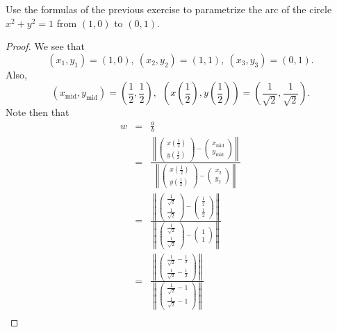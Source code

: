 \begin{exercise}{17}
    Use the formulas of the previous exercise to parametrize the arc of the circle $x^2 + y^2 = 1$ from $(1,0)$ to $(0,1)$.
\end{exercise}
\begin{proof}
We see that
$$(x_1,y_1) = (1,0),~(x_2,y_2) = (1,1),~(x_3,y_3) = (0,1).$$
Also,
$$(x_{\text{mid}}, y_{\text{mid}}) = \left(\frac{1}{2}, \frac{1}{2}\right),~~\left(x\left(\frac{1}{2}\right), y\left(\frac{1}{2}\right)\right) = \left(\frac{1}{\sqrt{2}},\frac{1}{\sqrt{2}}\right).$$
Note then that
\begin{eqnarray*}
    w
    & = & \frac{a}{b}\\
    & = & \frac{\left\|\left(\begin{array}{c} x\left(\frac{1}{2}\right)\\ y\left(\frac{1}{2}\right)\end{array}\right) - \left(\begin{array}{c} x_{\text{mid}}\\ y_{\text{mid}}\end{array}\right)\right\|}{\left\|\left(\begin{array}{c} x\left(\frac{1}{2}\right)\\ y\left(\frac{1}{2}\right)\end{array}\right) - \left(\begin{array}{c} x_2\\ y_2\end{array}\right)\right\|}\\
    & = & \frac{\left\|\left(\begin{array}{c} \frac{1}{\sqrt{2}}\\ \frac{1}{\sqrt{2}}\end{array}\right) - \left(\begin{array}{c} \frac{1}{2}\\ \frac{1}{2}\end{array}\right)\right\|}{\left\|\left(\begin{array}{c} \frac{1}{\sqrt{2}}\\ \frac{1}{\sqrt{2}}\end{array}\right) - \left(\begin{array}{c} 1\\ 1\end{array}\right)\right\|}\\
    & = & \frac{\left\|\left(\begin{array}{c} \frac{1}{\sqrt{2}} - \frac{1}{2}\\ \frac{1}{\sqrt{2}} - \frac{1}{2}\end{array}\right)\right\|}{\left\|\left(\begin{array}{c} \frac{1}{\sqrt{2}} - 1\\ \frac{1}{\sqrt{2}} - 1\end{array}\right)\right\|}\\

\end{eqnarray*}
\end{proof}

